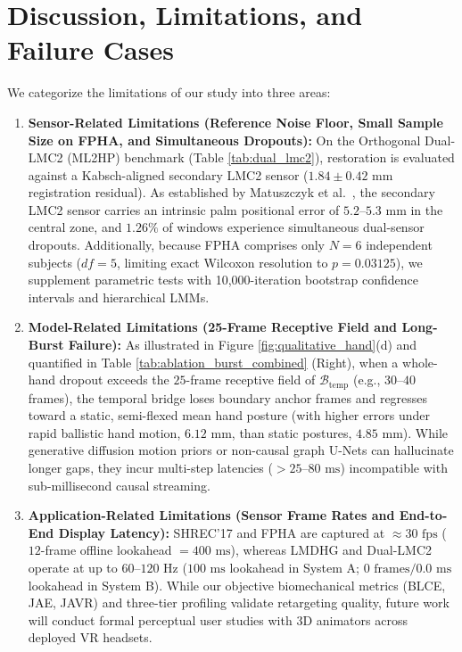\documentclass[10pt,twocolumn]{article}
\begin{document}
\section{Discussion, Limitations, and Failure Cases}
We categorize the limitations of our study into three areas:
\begin{enumerate}
    \item \textbf{Sensor-Related Limitations (Reference Noise Floor, Small Sample Size on FPHA, and Simultaneous Dropouts):} On the Orthogonal Dual-LMC2 (ML2HP) benchmark \cite{gilmartin2024dual} (Table \ref{tab:dual_lmc2}), restoration is evaluated against a Kabsch-aligned secondary LMC2 sensor ($1.84 \pm 0.42\text{ mm}$ registration residual). As established by Matuszczyk et al.\ \cite{matuszczyk2025comparative}, the secondary LMC2 sensor carries an intrinsic palm positional error of $5.2\text{--}5.3\text{ mm}$ in the central zone, and $1.26\%$ of windows experience simultaneous dual-sensor dropouts. Additionally, because FPHA \cite{garcia2018first} comprises only $N=6$ independent subjects ($df=5$, limiting exact Wilcoxon resolution to $p=0.03125$), we supplement parametric tests with 10,000-iteration bootstrap confidence intervals and hierarchical LMMs.
    \item \textbf{Model-Related Limitations (25-Frame Receptive Field and Long-Burst Failure):} As illustrated in Figure \ref{fig:qualitative_hand}(d) and quantified in Table \ref{tab:ablation_burst_combined} (Right), when a whole-hand dropout exceeds the $25$-frame receptive field of $\mathcal{B}_{\text{temp}}$ (e.g., $30\text{--}40$ frames), the temporal bridge loses boundary anchor frames and regresses toward a static, semi-flexed mean hand posture (with higher errors under rapid ballistic hand motion, $6.12\text{ mm}$, than static postures, $4.85\text{ mm}$). While generative diffusion motion priors \cite{rastgoo2025deep} or non-causal graph U-Nets \cite{xu2024spatial} can hallucinate longer gaps, they incur multi-step latencies ($>25\text{--}80\text{ ms}$) incompatible with sub-millisecond causal streaming.
    \item \textbf{Application-Related Limitations (Sensor Frame Rates and End-to-End Display Latency):} SHREC'17 \cite{desmedt2017shrec} and FPHA \cite{garcia2018first} are captured at $\approx 30\text{ fps}$ ($12$-frame offline lookahead $= 400\text{ ms}$), whereas LMDHG \cite{boulahia2017dynamic} and Dual-LMC2 \cite{gilmartin2024dual} operate at up to $60\text{--}120\text{ Hz}$ ($100\text{ ms}$ lookahead in System A; $0\text{ frames}/0.0\text{ ms}$ lookahead in System B). While our objective biomechanical metrics (BLCE, JAE, JAVR) and three-tier profiling validate retargeting quality, future work will conduct formal perceptual user studies with 3D animators across deployed VR headsets.
\end{enumerate}
\end{document}
